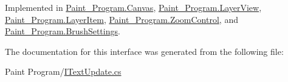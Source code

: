 Implemented in \mbox{\hyperlink{class_paint___program_1_1_canvas_ad80b3ef48814a229e01a330b49344f3b}{Paint\+\_\+\+Program.\+Canvas}}, \mbox{\hyperlink{class_paint___program_1_1_layer_view_a9524e183d6c00b15c217e9d5c1d14aea}{Paint\+\_\+\+Program.\+Layer\+View}}, \mbox{\hyperlink{class_paint___program_1_1_layer_item_a7cbff967883c3895e000050a5c6e2144}{Paint\+\_\+\+Program.\+Layer\+Item}}, \mbox{\hyperlink{class_paint___program_1_1_zoom_control_ab67ee2f3ff5a99c50279ac3b3602a523}{Paint\+\_\+\+Program.\+Zoom\+Control}}, and \mbox{\hyperlink{class_paint___program_1_1_brush_settings_a0669e5f09b62b9545e408f39689f30ed}{Paint\+\_\+\+Program.\+Brush\+Settings}}.



The documentation for this interface was generated from the following file\+:\begin{DoxyCompactItemize}
\item 
Paint Program/\mbox{\hyperlink{_i_text_update_8cs}{I\+Text\+Update.\+cs}}\end{DoxyCompactItemize}

